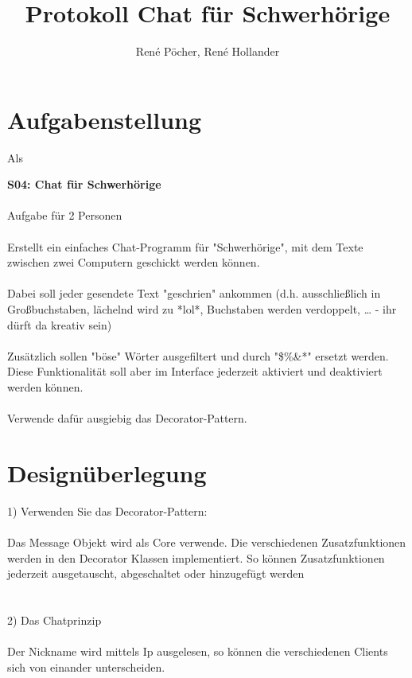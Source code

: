 \documentclass[a4paper, 11pt]{article}
\title{Protokoll Chat für Schwerhörige}
\author{René Pöcher, René Hollander}
\begin{document}
\maketitle

\newpage  \tableofcontents \newpage

\section{Aufgabenstellung}



Als 

\textbf{S04: Chat für Schwerhörige}
\\\\
Aufgabe für 2 Personen
\\\\
Erstellt ein einfaches Chat-Programm für "Schwerhörige", mit dem Texte zwischen zwei Computern geschickt werden können.
\\\\
Dabei soll jeder gesendete Text "geschrien" ankommen (d.h. ausschließlich in Großbuchstaben, lächelnd wird zu *lol*, Buchstaben werden verdoppelt, … - ihr dürft da kreativ sein)
\\\\
Zusätzlich sollen "böse" Wörter ausgefiltert und durch "\$\%\&*" ersetzt werden. Diese Funktionalität soll aber im Interface jederzeit aktiviert und deaktiviert werden können.
\\\\
Verwende dafür ausgiebig das Decorator-Pattern.

 \newpage


\section{Designüberlegung}

1) Verwenden Sie das Decorator-Pattern:
\\\\
Das Message Objekt wird als Core verwende.
Die verschiedenen Zusatzfunktionen werden in den Decorator Klassen implementiert. So können Zusatzfunktionen jederzeit ausgetauscht, abgeschaltet oder hinzugefügt werden
\\\\\\
2) Das Chatprinzip
\\\\
Der Nickname wird mittels Ip ausgelesen, so können die verschiedenen Clients sich von einander unterscheiden.
\end{document}
